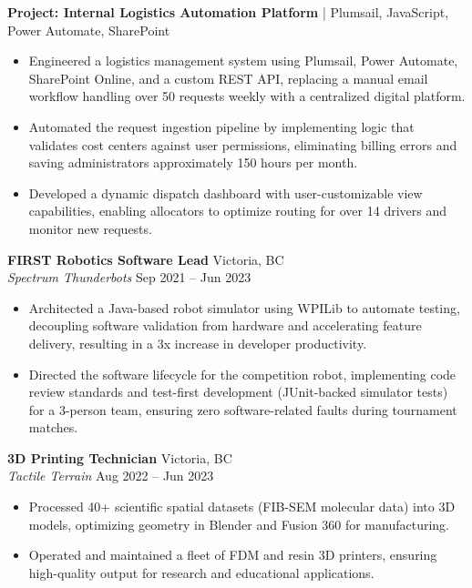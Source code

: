 \documentclass[11pt]{article}
\begin{document}
\vspace{4pt}

\noindent\textbf{\color{primaryColor}Project: Internal Logistics Automation Platform} | Plumsail, JavaScript, Power Automate, SharePoint
\begin{itemize}
    \item Engineered a logistics management system using Plumsail, Power Automate, SharePoint Online, and a custom REST API, replacing a manual email workflow handling over 50 requests weekly with a centralized digital platform.
    \item Automated the request ingestion pipeline by implementing logic that validates cost centers against user permissions, eliminating billing errors and saving administrators approximately 150 hours per month.
    \item Developed a dynamic dispatch dashboard with user-customizable view capabilities, enabling allocators to optimize routing for over 14 drivers and monitor new requests.
\end{itemize}

\vspace{8pt}

\textbf{FIRST Robotics Software Lead} \hfill Victoria, BC\\
\textit{Spectrum Thunderbots} \hfill Sep 2021 -- Jun 2023
\begin{itemize}
  \item Architected a Java-based robot simulator using WPILib to automate testing, decoupling software validation from hardware and accelerating feature delivery, resulting in a 3x increase in developer productivity.
  \item Directed the software lifecycle for the competition robot, implementing code review standards and test-first development (JUnit-backed simulator tests) for a 3-person team, ensuring zero software-related faults during tournament matches.
\end{itemize}

\vspace{8pt}

\textbf{3D Printing Technician} \hfill Victoria, BC\\
\textit{Tactile Terrain} \hfill Aug 2022 -- Jun 2023
\begin{itemize}
  \item Processed 40+ scientific spatial datasets (FIB-SEM molecular data) into 3D models, optimizing geometry in Blender and Fusion 360 for manufacturing.
  \item Operated and maintained a fleet of FDM and resin 3D printers, ensuring high-quality output for research and educational applications.
\end{itemize}
\end{document}
